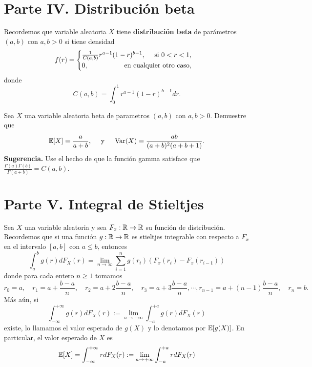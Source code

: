 \documentclass[12pt,a4paper]{article}
\begin{document}
    \section*{Parte IV. Distribución beta}

    Recordemos que variable aleatoria $X$ tiene \textbf{distribución beta} de parámetros $(a,b)$ con $a,b\gt0$ si tiene densidad
    \begin{equation*}
        f(r)=
        \begin{cases}
            \frac{1}{C(a,b)}r^{a-1}(1-r)^{b-1},\quad\text{ si }0\lt r\lt 1,\\
            0,\hfill\text{en cualquier otro caso},
        \end{cases}
    \end{equation*}
    donde
    \begin{equation*}
        C(a,b)=\int_{0}^{1}r^{a-1}(1-r)^{b-1}dr.
    \end{equation*}

    \begin{mdframed}[style=mdpinkbox,frametitle={Ejercicio 6}]
        Sea $X$ una variable aleatoria beta de parametros $(a,b)$ con $a,b\gt0$. Demuestre que
        \begin{equation*}
            \mathbb{E}[X]=\frac{a}{a+b},\quad\text{ y }\quad\operatorname{Var}(X)=\frac{ab}{(a+b)^{2}(a+b+1)}.
        \end{equation*}
        \textbf{Sugerencia.} Use el hecho de que la función  gamma satisface que $\frac{\Gamma(a)\Gamma(b)}{\Gamma(a+b)}=C(a,b)$.
    \end{mdframed}

    \section*{Parte V. Integral de Stieltjes}

    Sea $X$ una variable aleatoria y sea $F_{x}:\mathbb{R}\to\mathbb{R}$ su función de distribución. Recordemos que si una función $g:\mathbb{R}\to\mathbb{R}$ es
    stieltjes integrable con respecto a $F_{x}$ en el intervalo $[a,b]$ con $a\leq b$, entonces
    \begin{equation*}
        \int_{a}^{b}g(r)dF_{X}(r)=\lim_{n\to\infty}\sum_{i=1}^{n}g(r_{i})(F_{x}(r_{i})-F_{x}(r_{i-1}))
    \end{equation*}
    donde para cada entero $n\geq1$ tomamos
    \begin{equation*}
        r_{0}=a,\quad r_{1}=a+\frac{b-a}{n},\quad r_{2}=a+2\frac{b-a}{n},\quad r_{3}=a+3\frac{b-a}{n},\cdots,r_{n-1}=a+(n-1)\frac{b-a}{n},\quad r_{n}=b.
    \end{equation*}
    Más aún, si
    \begin{equation*}
        \int_{-\infty}^{+\infty}g(r)dF_{X}(r):=\lim_{a\to+\infty}\int_{-a}^{+a}g(r)dF_{X}(r)
    \end{equation*}
    existe, lo llamamos el valor esperado de $g(X)$ y lo denotamos por $\mathbb{E}[g(X)]$. En particular, el valor esperado de $X$ es
    \begin{equation*}
        \mathbb{E}[X]=\int_{-\infty}^{+\infty}rdF_{X}(r):=\lim_{a\to+\infty}\int_{-a}^{+a}rdF_{X}(r)
    \end{equation*}
\end{document}
